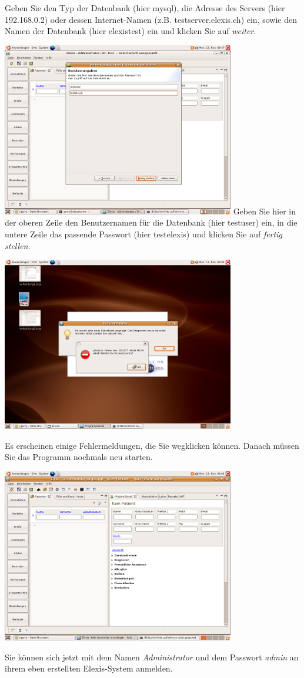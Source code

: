 Geben Sie den Typ der Datenbank (hier mysql), die Adresse des Servers (hier 192.168.0.2) oder dessen Internet-Namen (z.B. testserver.elexis.ch) ein, sowie den Namen der Datenbank (hier  elexistest) ein und klicken Sie auf \textit{weiter}.

\includegraphics[width=4in]{images/verbindung12.png}
Geben Sie hier in der oberen Zeile den Benutzernamen für die Datenbank (hier testuser) ein, in die untere Zeile das passende Passwort (hier testelexis) und klicken Sie auf \textit{fertig stellen}.

\includegraphics[width=4in]{images/verbindung13.png}

 Es erscheinen einige Fehlermeldungen, die Sie wegklicken können. Danach müssen Sie das Programm nochmals neu starten.

\includegraphics[width=4in]{images/verbindung14.png}

Sie können sich jetzt mit dem Namen \textit{Administrator} und dem Passwort \textit{admin} an ihrem eben erstellten Elexis-System anmelden.


